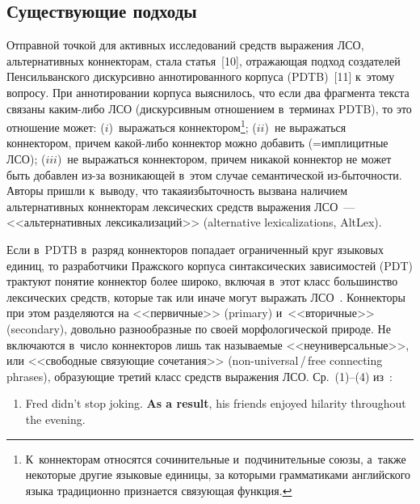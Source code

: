 \begin{multicols}{2}
\vspace*{-8pt}

\section{Существующие подходы}

\vspace*{-1pt}

Отправной точкой для активных исследований средств выражения ЛСО, 
альтернативных коннекторам, стала статья~[10], отражающая подход 
создателей Пенсильванского дискурсивно аннотированного корпуса (PDTB)~[11] к~этому вопросу. При аннотировании 
корпуса выяснилось, что если два фрагмента текста связаны ка\-ки\-м-ли\-бо 
ЛСО (дискурсивным отношением в~терминах PDTB), то это отношение 
может: ($i$)~выражаться коннектором\footnote{К~коннекторам относятся 
сочинительные и~подчинительные союзы, а~также некоторые другие языковые единицы, 
за которыми грамматиками английского языка традиционно признается связующая 
функция.}; ($ii$)~не выражаться коннектором, причем какой-либо коннектор 
можно добавить (=\;импли\-цит\-ные ЛСО); ($iii$)~не выражаться коннектором, 
причем никакой коннектор не может быть добавлен из-за возникающей 
в~этом случае семантической из-\linebreak быточности. Авторы пришли к~выводу, что 
такая\linebreak избыточность вызвана наличием альтернативных коннекторам 
лексических средств выражения ЛСО~--- <<альтернативных 
лексикализаций>> (alternative lexicalizations, AltLex).

Если в~PDTB в~разряд коннекторов попадает ограниченный круг языковых 
единиц, то разработчики Пражского корпуса синтаксических зависимостей 
 (PDT) трактуют понятие коннектор более 
широко, включая в~этот класс большинство лексических средств, которые так 
или иначе могут выражать ЛСО~\cite{3-in, 12-in}. Коннекторы при этом 
разделяются на <<первичные>> (primary) и~<<вторичные>> (secondary), 
довольно разнообразные по своей морфологической природе. Не включаются в~чис\-ло коннекторов лишь так называемые <<неуниверсальные>>, или 
<<свободные связующие сочетания>> (non-\linebreak universal\,/\,free connecting 
phrases), образующие третий класс средств выражения ЛСО. Ср.~(1)--(4) 
из~\cite[с.~51, 68]{3-in}:
{\small
\begin{enumerate}[(1)]
\item Fred didn't stop joking. \textbf{As a result}, his friends enjoyed hilarity throughout the 
evening.


\end{enumerate}}
\end{multicols}
